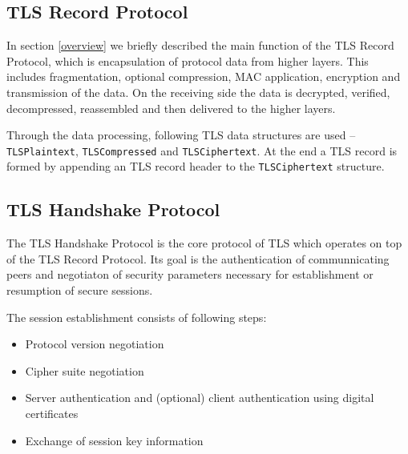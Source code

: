 \subsection{TLS Record Protocol}
    In section \ref{overview} we briefly described the main function of the
    TLS Record Protocol, which is encapsulation of protocol data from higher
    layers. This includes fragmentation, optional compression, MAC application,
    encryption and transmission of the data. On the receiving side the data is
    decrypted, verified, decompressed, reassembled and then delivered to the
    higher layers.

    Through the data processing, following TLS data structures are used --
    \texttt{TLSPlaintext}, \texttt{TLSCompressed} and \texttt{TLSCiphertext}.
    At the end a TLS record is formed by appending an TLS record header to
    the \texttt{TLSCiphertext} structure.

\subsection{TLS Handshake Protocol}
    The TLS Handshake Protocol is the core protocol of TLS which operates on
    top of the TLS Record Protocol. Its goal is the authentication of communnicating
    peers and negotiaton of security parameters necessary for establishment or
    resumption of secure sessions.



    \noindent The session establishment consists of following steps:
    \begin{itemize}
        \item Protocol version negotiation
        \item Cipher suite negotiation
        \item Server authentication and (optional) client authentication using
              digital certificates
        \item Exchange of session key information
    \end{itemize}

